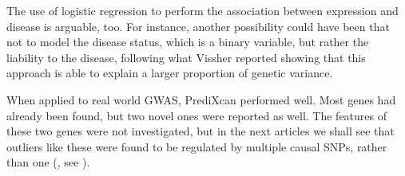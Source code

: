 \documentclass[../main.tex]{subfiles}
\begin{document}
The use of logistic regression to perform the association between 
expression and disease is arguable, too. For instance, another 
possibility could have been that not to model the disease status, which 
is a binary variable, but rather the liability to the disease, following 
what Vissher\autocite{Visscher2008} reported showing that this approach 
is able to explain a larger proportion of genetic variance.

When applied to real world GWAS, PrediXcan performed well. Most genes 
had already been found, but two novel ones were reported as well. The 
features of these two genes were not investigated, but in the next 
articles we shall see that outliers like these were found to be 
regulated by multiple causal SNPs, rather than one (\eg, see 
).
\end{document}
